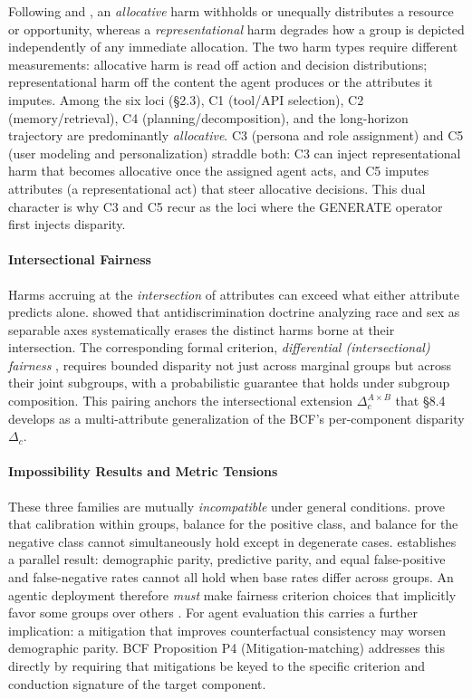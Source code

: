 \documentclass[acmsmall,nonacm]{acmart}
\begin{document}
Following \cite{barocas2023fairness} and \cite{blodgett2020language}, an \emph{allocative} harm withholds or unequally distributes a resource or opportunity, whereas a \emph{representational} harm degrades how a group is depicted independently of any immediate allocation. The two harm types require different measurements: allocative harm is read off action and decision distributions; representational harm off the content the agent produces or the attributes it imputes. Among the six loci (\S{}2.3), C1 (tool/API selection), C2 (memory/retrieval), C4 (planning/decomposition), and the long-horizon trajectory are predominantly \emph{allocative}. C3 (persona and role assignment) and C5 (user modeling and personalization) straddle both: C3 can inject representational harm that becomes allocative once the assigned agent acts, and C5 imputes attributes (a representational act) that steer allocative decisions. This dual character is why C3 and C5 recur as the loci where the GENERATE operator first injects disparity.

\paragraph{Intersectional Fairness}

Harms accruing at the \emph{intersection} of attributes can exceed what either attribute predicts alone. \cite{crenshaw1989demarginalizing} showed that antidiscrimination doctrine analyzing race and sex as separable axes systematically erases the distinct harms borne at their intersection. The corresponding formal criterion, \emph{differential (intersectional) fairness} \cite{foulds2020intersectional}, requires bounded disparity not just across marginal groups but across their joint subgroups, with a probabilistic guarantee that holds under subgroup composition. This pairing anchors the intersectional extension $\Delta_c^{A \times B}$ that \S{}8.4 develops as a multi-attribute generalization of the BCF's per-component disparity $\Delta_c$.

\paragraph{Impossibility Results and Metric Tensions}

These three families are mutually \emph{incompatible} under general conditions. \cite{kleinberg2017inherent} prove that calibration within groups, balance for the positive class, and balance for the negative class cannot simultaneously hold except in degenerate cases. \cite{chouldechova2017fair} establishes a parallel result: demographic parity, predictive parity, and equal false-positive and false-negative rates cannot all hold when base rates differ across groups. An agentic deployment therefore \emph{must} make fairness criterion choices that implicitly favor some groups over others \cite{pessach2022review,tang2023what}. For agent evaluation this carries a further implication: a mitigation that improves counterfactual consistency may worsen demographic parity. BCF Proposition P4 (Mitigation-matching) addresses this directly by requiring that mitigations be keyed to the specific criterion and conduction signature of the target component.
\end{document}
